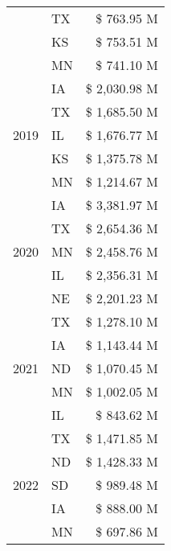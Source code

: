 \begin{tabular}{llr}
 & TX & \$ 763.95 M \\
 & KS & \$ 753.51 M \\
 & MN & \$ 741.10 M \\
\cline{1-3}
\multirow[t]{5}{*}{2019} & IA & \$ 2,030.98 M \\
 & TX & \$ 1,685.50 M \\
 & IL & \$ 1,676.77 M \\
 & KS & \$ 1,375.78 M \\
 & MN & \$ 1,214.67 M \\
\cline{1-3}
\multirow[t]{5}{*}{2020} & IA & \$ 3,381.97 M \\
 & TX & \$ 2,654.36 M \\
 & MN & \$ 2,458.76 M \\
 & IL & \$ 2,356.31 M \\
 & NE & \$ 2,201.23 M \\
\cline{1-3}
\multirow[t]{5}{*}{2021} & TX & \$ 1,278.10 M \\
 & IA & \$ 1,143.44 M \\
 & ND & \$ 1,070.45 M \\
 & MN & \$ 1,002.05 M \\
 & IL & \$ 843.62 M \\
\cline{1-3}
\multirow[t]{5}{*}{2022} & TX & \$ 1,471.85 M \\
 & ND & \$ 1,428.33 M \\
 & SD & \$ 989.48 M \\
 & IA & \$ 888.00 M \\
 & MN & \$ 697.86 M \\
\cline{1-3}
\bottomrule
\end{tabular}
